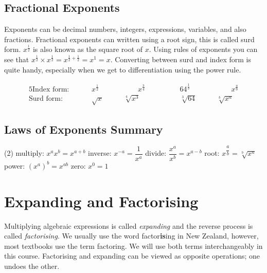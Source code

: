 \subsection*{Fractional Exponents}
Exponents can be decimal numbers, integers, expressions, variables, and also fractions. Fractional exponents can written using a root sign, this is called surd form. $x^{\frac{1}{2}}$ is also known as the square root of $x$. Using rules of exponents you can see that $x^{\frac{1}{2}}\times x^{\frac{1}{2}}=x^{\frac{1}{2}+\frac{1}{2}}=x^1=x$. Converting between surd and index form is quite handy, especially when we get to differentiation using the power rule.
\begin{tcolorbox}\begin{alignat*}{5}\textrm{Index form: }\qquad&x^{\frac{1}{2}}&\qquad\qquad x^{\frac{3}{4}} &\qquad\qquad 64^{\frac{1}{3}}&\qquad\qquad x^\frac{a}{b}\\
\textrm{Surd form: }\qquad&\sqrt{x}&\qquad \sqrt[4]{x^3}&\qquad\qquad\sqrt[3]{64}&\qquad \sqrt[b]{x^a}
\end{alignat*}\end{tcolorbox}

\subsection*{Laws of Exponents Summary}
\begin{tcolorbox}
\begin{tasks}[style=itemize](2)
	\task[] multiply: $ x^a x^b = x^{a+b}$
	\task[] inverse: $x^{-a}  =\dfrac{1}{x^a} $
	\task[] divide: $ \dfrac{x^a}{x^b}  =x^{a-b} $
	\task[] root: $ x^{\dfrac{a}{b}}  =\sqrt[b]{x^a}$
	\task[] power: $\displaystyle (x^a)^b  =x^{ab} $
	\task[] zero: $x^0  =1 $
\end{tasks}
\end{tcolorbox}

\section*{Expanding and Factorising}
Multiplying algebraic expressions is called \emph{expanding} and the reverse process is called \emph{factorising}. We usually use the word factor\textbf{is}ing in New Zealand, however, most textbooks use the term factoring. We will use both terms interchangeably in this course. Factorising and expanding can be viewed as opposite operations; one undoes the other.

